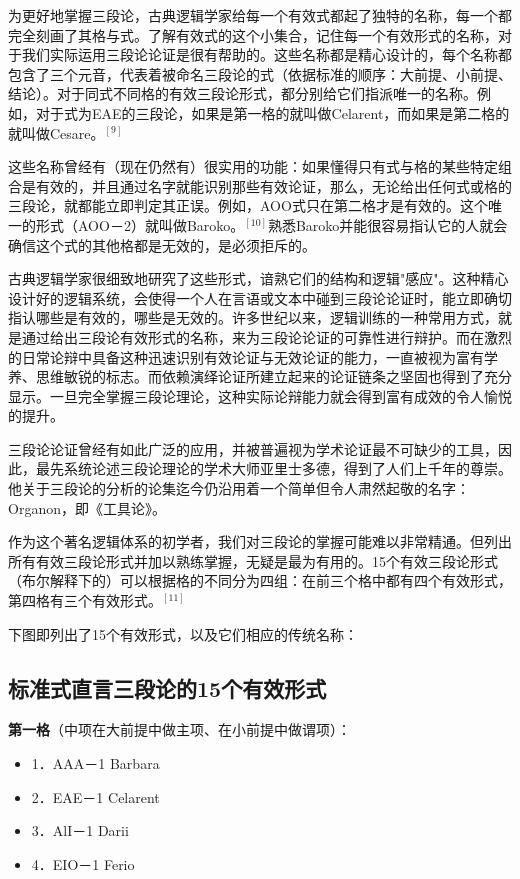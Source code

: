 为更好地掌握三段论，古典逻辑学家给每一个有效式都起了独特的名称，每一个都完全刻画了其格与式。了解有效式的这个小集合，记住每一个有效形式的名称，对于我们实际运用三段论论证是很有帮助的。这些名称都是精心设计的，每个名称都包含了三个元音，代表着被命名三段论的式（依据标准的顺序：大前提、小前提、结论）。对于同式不同格的有效三段论形式，都分别给它们指派唯一的名称。例如，对于式为EAE的三段论，如果是第一格的就叫做Celarent，而如果是第二格的就叫做Cesare。$^{[9]}$

这些名称曾经有（现在仍然有）很实用的功能：如果懂得只有式与格的某些特定组合是有效的，并且通过名字就能识别那些有效论证，那么，无论给出任何式或格的三段论，就都能立即判定其正误。例如，AOO式只在第二格才是有效的。这个唯一的形式（AOO－2）就叫做Baroko。$^{[10]}$熟悉Baroko并能很容易指认它的人就会确信这个式的其他格都是无效的，是必须拒斥的。

古典逻辑学家很细致地研究了这些形式，谙熟它们的结构和逻辑"感应"。这种精心设计好的逻辑系统，会使得一个人在言语或文本中碰到三段论论证时，能立即确切指认哪些是有效的，哪些是无效的。许多世纪以来，逻辑训练的一种常用方式，就是通过给出三段论有效形式的名称，来为三段论论证的可靠性进行辩护。而在激烈的日常论辩中具备这种迅速识别有效论证与无效论证的能力，一直被视为富有学养、思维敏锐的标志。而依赖演绎论证所建立起来的论证链条之坚固也得到了充分显示。一旦完全掌握三段论理论，这种实际论辩能力就会得到富有成效的令人愉悦的提升。

三段论论证曾经有如此广泛的应用，并被普遍视为学术论证最不可缺少的工具，因此，最先系统论述三段论理论的学术大师亚里士多德，得到了人们上千年的尊崇。他关于三段论的分析的论集迄今仍沿用着一个简单但令人肃然起敬的名字：Organon，即《工具论》。

作为这个著名逻辑体系的初学者，我们对三段论的掌握可能难以非常精通。但列出所有有效三段论形式并加以熟练掌握，无疑是最为有用的。15个有效三段论形式（布尔解释下的）可以根据格的不同分为四组：在前三个格中都有四个有效形式，第四格有三个有效形式。$^{[11]}$

下图即列出了15个有效形式，以及它们相应的传统名称：

\subsection{标准式直言三段论的15个有效形式}
\textbf{第一格}（中项在大前提中做主项、在小前提中做谓项）：
\begin{itemize}
\item 1．AAA－1 Barbara
\item 2．EAE－1 Celarent
\item 3．AlI－1 Darii
\item 4．EIO－1 Ferio
\end{itemize}

